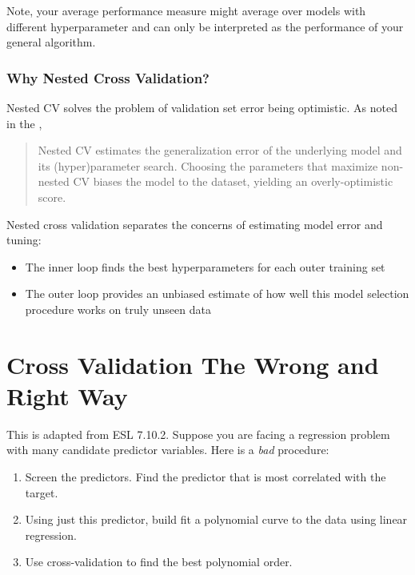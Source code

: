 Note, your average performance measure might average over models with different hyperparameter and can only be interpreted as the performance of your general algorithm.


\subsubsection{Why Nested Cross Validation?}

Nested CV solves the problem of validation set error being optimistic. As noted in the , 
\begin{quotation}
\noindent Nested CV estimates the generalization error of the underlying model and its (hyper)parameter search. Choosing the parameters that maximize non-nested CV biases the model to the dataset, yielding an overly-optimistic score.
\end{quotation}

Nested cross validation separates the concerns of estimating model error and tuning:
\begin{itemize}
\item The inner loop finds the best hyperparameters for each outer training set
\item The outer loop provides an unbiased estimate of how well this model selection procedure works on truly unseen data
\end{itemize}


\section{Cross Validation The Wrong and Right Way}

This is adapted from ESL 7.10.2. Suppose you are facing a regression problem with many candidate predictor variables. Here is a \emph{bad} procedure:

\begin{enumerate}
   \item Screen the predictors. Find the predictor that is most correlated with the target. 
   \item Using just this predictor, build fit a polynomial curve to the data using linear regression. 
   \item Use cross-validation to find the best polynomial order. 
\end{enumerate}

